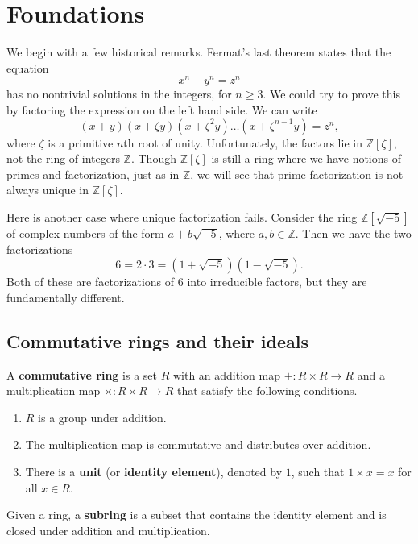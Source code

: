 \chapter{Foundations}

We begin with a few historical remarks.  Fermat's last theorem states that the
equation
  \[ \label{ft} x^n  + y^n = z^n \]
has no nontrivial solutions in the integers, for $n \ge 3$.  We could try to
prove this by factoring the expression on the left hand side. We can write
  \[ (x+y)(x+ \zeta y) (x+ \zeta^2y) \dots (x+ \zeta^{n-1}y) = z^n, \]
where $\zeta$ is a primitive $n$th root of unity.  Unfortunately, the factors
lie in $\mathbb{Z}[\zeta]$, not the ring of integers $\mathbb{Z}$.  Though
$\mathbb{Z}[\zeta]$ is still a ring where we have notions of primes and
factorization, just as in $\mathbb{Z}$, we will see that prime factorization
is not always unique in $\mathbb{Z}[\zeta]$.

Here is another case where unique factorization fails.  Consider the ring
$\mathbb{Z}[\sqrt{-5}]$ of complex numbers of the form $a + b\sqrt{-5}$, where
$a, b \in \mathbb{Z}$.  Then we have the two factorizations
  \[ 6 = 2 \cdot 3 = (1 + \sqrt{-5})(1 - \sqrt{-5}). \]
Both of these are factorizations of 6 into irreducible factors, but they
are fundamentally different.

\section{Commutative rings and their ideals}

\begin{definition} 
A \textbf{commutative ring} is a set $R$ with an addition map
$+ : R \times R \to R$ and a multiplication map $\times : R \times R \to R$
that satisfy the following conditions.

\begin{enumerate}
  \item $R$ is a group under addition.
  \item The multiplication map is commutative and distributes over addition.
  \item There is a \textbf{unit} (or \textbf{identity element}), denoted by
        $1$, such that $1 \times x = x$ for all $x \in R$.
\end{enumerate}

Given a ring, a \textbf{subring} is a subset that contains the identity
element and is closed under addition and multiplication.
\end{definition} 

